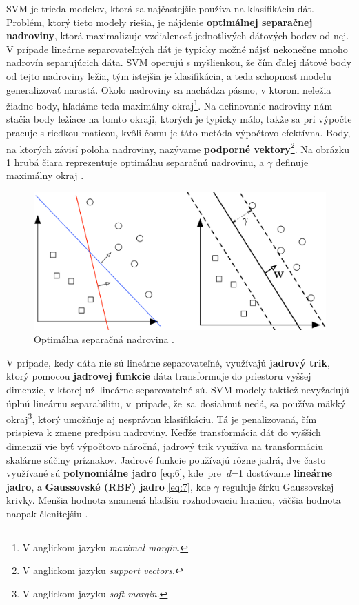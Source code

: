 SVM je trieda modelov, ktorá sa najčastejšie používa na klasifikáciu dát. Problém, ktorý tieto modely riešia, je nájdenie \textbf{optimálnej separačnej nadroviny}, ktorá maximalizuje vzdialenosť jednotlivých dátových bodov od nej. V prípade lineárne separovateľných dát je typicky možné nájsť nekonečne mnoho nadrovín separujúcich dáta. SVM operujú s myšlienkou, že čím ďalej dátové body od tejto nadroviny ležia, tým istejšia je klasifikácia, a teda schopnosť modelu generalizovať narastá. Okolo nadroviny sa nachádza pásmo, v ktorom neležia žiadne body, hľadáme teda maximálny okraj\footnote{V anglickom jazyku \textit{maximal margin}.}. Na definovanie nadroviny nám stačia body ležiace na tomto okraji, ktorých je typicky málo, takže sa pri výpočte pracuje s riedkou maticou, kvôli čomu je táto metóda výpočtovo efektívna. Body, na ktorých závisí poloha nadroviny, nazývame \textbf{podporné vektory}\footnote{V anglickom jazyku \textit{support vectors}.}. Na obrázku \ref{fig:margin} hrubá čiara reprezentuje optimálnu separačnú nadrovinu, a \textit{\( \gamma \)} definuje maximálny okraj \cite{Cristianini_Scholkopf_2002}\cite{Suthaharan2016}.

\begin{figure}[H]
    \centering
    \includegraphics[scale=0.5]{img/margin.png}
    \caption{Optimálna separačná nadrovina \cite{Lecture_SVM}.}
    \label{fig:margin}
\end{figure}

V prípade, kedy dáta nie sú lineárne separovateľné, využívajú \textbf{jadrový trik}, ktorý pomocou \textbf{jadrovej funkcie} dáta transformuje do priestoru vyššej dimenzie, v ktorej už~lineárne separovateľné sú. SVM modely taktiež nevyžadujú úplnú lineárnu separabilitu, v~prípade, že~sa~dosiahnuť nedá, sa používa mäkký okraj\footnote{V anglickom jazyku \textit{soft margin}.}, ktorý umožňuje aj nesprávnu klasifikáciu. Tá je penalizovaná, čím prispieva k zmene predpisu nadroviny. Keďže transformácia dát do vyšších dimenzií vie byť výpočtovo náročná, jadrový trik využíva na transformáciu skalárne súčiny príznakov. Jadrové funkcie používajú rôzne jadrá, dve často využívané sú \textbf{polynomiálne jadro} \ref{eq:6}, kde~pre~\textit{d}=1 dostávame \textbf{lineárne jadro}, a \textbf{Gaussovské (RBF) jadro} \ref{eq:7}, kde \textit{\( \gamma \)} reguluje šírku Gaussovskej krivky. Menšia hodnota znamená hladšiu rozhodovaciu hranicu, väčšia hodnota naopak členitejšiu \cite{Cristianini_Scholkopf_2002}\cite{Suthaharan2016}.


